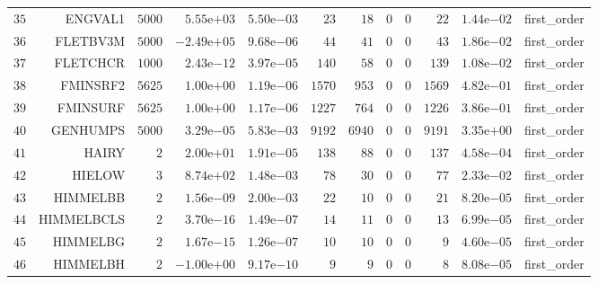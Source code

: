 \begin{longtable}{rrrrrrrrrrrr}
  \(    35\) & ENGVAL1 & \(  5000\) & \( 5.55\)e\(+03\) & \( 5.50\)e\(-03\) & \(    23\) & \(    18\) & \(     0\) & \(     0\) & \(    22\) & \( 1.44\)e\(-02\) & first\_order \\
  \(    36\) & FLETBV3M & \(  5000\) & \(-2.49\)e\(+05\) & \( 9.68\)e\(-06\) & \(    44\) & \(    41\) & \(     0\) & \(     0\) & \(    43\) & \( 1.86\)e\(-02\) & first\_order \\
  \(    37\) & FLETCHCR & \(  1000\) & \( 2.43\)e\(-12\) & \( 3.97\)e\(-05\) & \(   140\) & \(    58\) & \(     0\) & \(     0\) & \(   139\) & \( 1.08\)e\(-02\) & first\_order \\
  \(    38\) & FMINSRF2 & \(  5625\) & \( 1.00\)e\(+00\) & \( 1.19\)e\(-06\) & \(  1570\) & \(   953\) & \(     0\) & \(     0\) & \(  1569\) & \( 4.82\)e\(-01\) & first\_order \\
  \(    39\) & FMINSURF & \(  5625\) & \( 1.00\)e\(+00\) & \( 1.17\)e\(-06\) & \(  1227\) & \(   764\) & \(     0\) & \(     0\) & \(  1226\) & \( 3.86\)e\(-01\) & first\_order \\
  \(    40\) & GENHUMPS & \(  5000\) & \( 3.29\)e\(-05\) & \( 5.83\)e\(-03\) & \(  9192\) & \(  6940\) & \(     0\) & \(     0\) & \(  9191\) & \( 3.35\)e\(+00\) & first\_order \\
  \(    41\) & HAIRY & \(     2\) & \( 2.00\)e\(+01\) & \( 1.91\)e\(-05\) & \(   138\) & \(    88\) & \(     0\) & \(     0\) & \(   137\) & \( 4.58\)e\(-04\) & first\_order \\
  \(    42\) & HIELOW & \(     3\) & \( 8.74\)e\(+02\) & \( 1.48\)e\(-03\) & \(    78\) & \(    30\) & \(     0\) & \(     0\) & \(    77\) & \( 2.33\)e\(-02\) & first\_order \\
  \(    43\) & HIMMELBB & \(     2\) & \( 1.56\)e\(-09\) & \( 2.00\)e\(-03\) & \(    22\) & \(    10\) & \(     0\) & \(     0\) & \(    21\) & \( 8.20\)e\(-05\) & first\_order \\
  \(    44\) & HIMMELBCLS & \(     2\) & \( 3.70\)e\(-16\) & \( 1.49\)e\(-07\) & \(    14\) & \(    11\) & \(     0\) & \(     0\) & \(    13\) & \( 6.99\)e\(-05\) & first\_order \\
  \(    45\) & HIMMELBG & \(     2\) & \( 1.67\)e\(-15\) & \( 1.26\)e\(-07\) & \(    10\) & \(    10\) & \(     0\) & \(     0\) & \(     9\) & \( 4.60\)e\(-05\) & first\_order \\
  \(    46\) & HIMMELBH & \(     2\) & \(-1.00\)e\(+00\) & \( 9.17\)e\(-10\) & \(     9\) & \(     9\) & \(     0\) & \(     0\) & \(     8\) & \( 8.08\)e\(-05\) & first\_order \\

\end{longtable}

